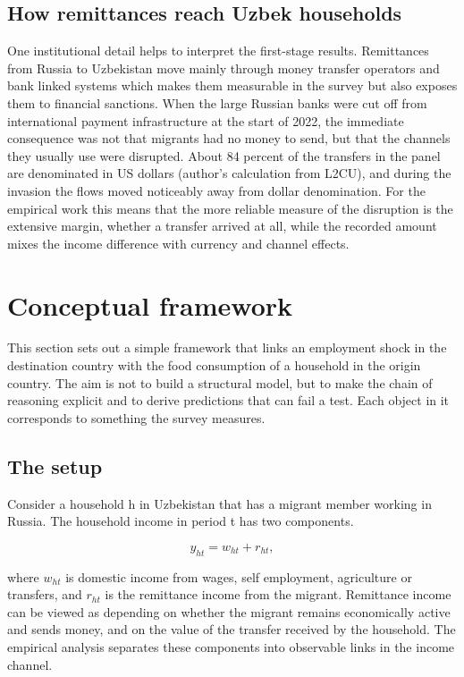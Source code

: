 \subsection{How remittances reach Uzbek households}\label{sec:3-4}

One institutional detail helps to interpret the first-stage results. Remittances from Russia to Uzbekistan move mainly through money transfer operators and bank linked systems which makes them measurable in the survey but also exposes them to financial sanctions. When the large Russian banks were cut off from international payment infrastructure at the start of 2022, the immediate consequence was not that migrants had no money to send, but that the channels they usually use were disrupted. About 84 percent of the transfers in the panel are denominated in US dollars (author's calculation from L2CU), and during the invasion the flows moved noticeably away from dollar denomination. For the empirical work this means that the more reliable measure of the disruption is the extensive margin, whether a transfer arrived at all, while the recorded amount mixes the income difference with currency and channel effects.

\section{Conceptual framework}\label{sec:4}

This section sets out a simple framework that links an employment shock in the destination country with the food consumption of a household in the origin country. The aim is not to build a structural model, but to make the chain of reasoning explicit and to derive predictions that can fail a test. Each object in it corresponds to something the survey measures.

\subsection{The setup}\label{sec:4-1}

Consider a household h in Uzbekistan that has a migrant member working in Russia. The household income in period t has two components.

\begin{equation}\label{eq:income}
y_{ht} = w_{ht} + r_{ht},
\end{equation}

where $w_{ht}$ is domestic income from wages, self employment, agriculture or transfers, and $r_{ht}$ is the remittance income from the migrant. Remittance income can be viewed as depending on whether the migrant remains economically active and sends money, and on the value of the transfer received by the household. The empirical analysis separates these components into observable links in the income channel.


